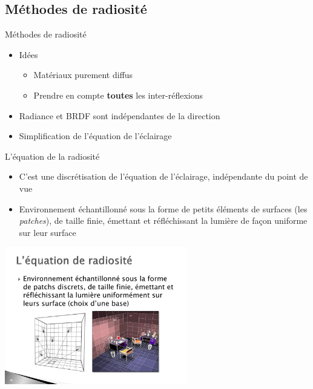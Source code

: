 \subsection{Méthodes de radiosité}

\begin{frame}{Méthodes de radiosité}
    \begin{itemize}
        \item Idées 
        \begin{itemize}
            \item Matériaux purement diffus 
            \item Prendre en compte \textbf{toutes} les inter-réflexions
        \end{itemize}
        \item Radiance et BRDF sont indépendantes de la direction
        \item Simplification de l'équation de l'éclairage 
    \end{itemize} 
\end{frame}


\begin{frame}{L'équation de la radiosité}
    \begin{itemize}
        \item C'est une discrétisation de l'équation de l'éclairage, indépendante du point de vue
        \item Environnement échantillonné sous la forme de petits éléments de surfaces (les \emph{patches}), de taille finie, émettant et réfléchissant la lumière de façon uniforme sur leur surface 
    \end{itemize}
    \begin{center}
    \includegraphics[width=0.6\textwidth]{figs/patches.pdf}
    \end{center}
\end{frame}

